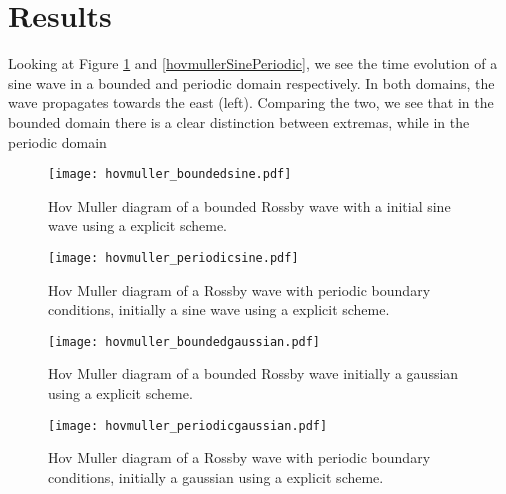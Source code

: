 \section{Results}
\label{sec:results}

Looking at Figure \ref{fig:hovmullerSineBounded} and \ref{hovmullerSinePeriodic}, we see the time evolution of a sine wave in a bounded and periodic domain respectively. In both domains, the wave propagates towards the east (left). Comparing the two, we see that in the bounded domain there is a clear distinction between extremas, while in the periodic domain 
\begin{figure}[htbp]
	\centering
	\texttt{[image: hovmuller\_boundedsine.pdf]}
	\caption{Hov Muller diagram of a bounded Rossby wave with a initial sine wave using a explicit scheme.}
	\label{fig:hovmullerSineBounded}
\end{figure}

\begin{figure}[htbp]
	\centering
	\texttt{[image: hovmuller\_periodicsine.pdf]}
	\caption{Hov Muller diagram of a Rossby wave with periodic boundary conditions, initially a sine wave using a explicit scheme.}
	\label{fig:hovmullerSinePeriodic}
\end{figure}


\begin{figure}[htbp]
	\centering
	\texttt{[image: hovmuller\_boundedgaussian.pdf]}
	\caption{Hov Muller diagram of a bounded Rossby wave initially a gaussian using a explicit scheme.}
	\label{fig:hovmullerGaussianBounded}
\end{figure}



\begin{figure}[htbp]
	\centering
	\texttt{[image: hovmuller\_periodicgaussian.pdf]}
	\caption{Hov Muller diagram of a Rossby wave with periodic boundary conditions, initially a gaussian using a explicit scheme.}
	\label{fig:hovmullerGaussianPeriodic}
\end{figure}

